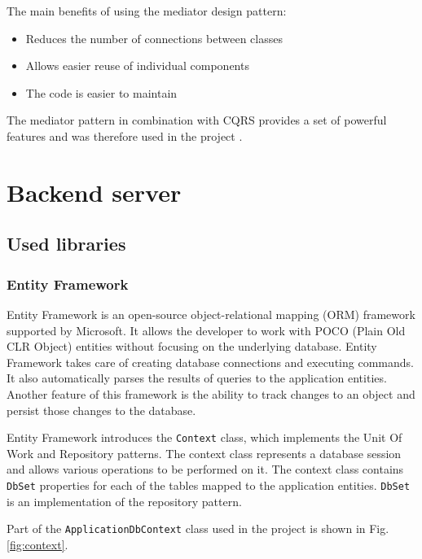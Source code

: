 \documentclass[a4paper,twoside,12pt]{book}
\begin{document}
The main benefits of using the mediator design pattern: 
\begin{itemize}
\item Reduces the number of connections between classes
\item Allows easier reuse of individual components
\item The code is easier to maintain
\end{itemize}

The mediator pattern in combination with CQRS provides a set of powerful features and was therefore used in the project \cite{bib:mediatorCQRS}.

\section{Backend server}

\subsection{Used libraries}

\subsubsection{Entity Framework}
Entity Framework is an open-source object-relational mapping (ORM) framework supported by Microsoft. It allows the developer to work with POCO (Plain Old CLR Object) entities without focusing on the underlying database. Entity Framework takes care of creating database connections and executing commands. It also automatically parses the results of queries to the application entities. Another feature of this framework is the ability to track changes to an object and persist those changes to the database. 

Entity Framework introduces the \lstinline|Context| class, which implements the Unit Of Work and Repository patterns. The context class represents a database session and allows various operations to be performed on it. The context class contains \lstinline|DbSet| properties for each of the tables mapped to the application entities. \lstinline|DbSet| is an implementation of the repository pattern. 

Part of the \lstinline|ApplicationDbContext| class used in the project is shown in Fig. \ref{fig:context}.
     
\end{document}
